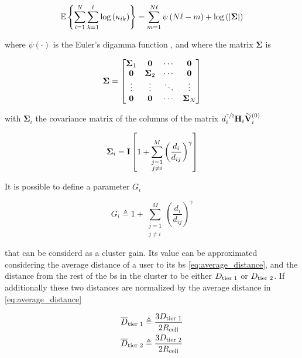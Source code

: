 \begin{equation} \label{eq:sum_log_kappa}
    \mathbb{E}\left\{\sum_{i=1}^{N}\sum_{k=1}^{\ell}\log\left(\kappa_{ik}
    \right)\right\} = \sum_{m = 1}^{N\ell} \psi\left(N\ell - m\right) +
    \log\left(\left|\mathbf{\Sigma}\right|\right)
\end{equation}

\noindent
where $\psi\left(\cdot\right)$ is the Euler's digamma function
\cite{gradshteyn00}, and where the matrix $\mathbf{\Sigma}$ is

\begin{equation} \label{eq:covariance_total}
    \mathbf{\Sigma} = \begin{bmatrix}
        \mathbf{\Sigma}_1 & \mathbf{0} & \cdots & \mathbf{0} \\
        \mathbf{0} & \mathbf{\Sigma}_2 & \cdots & \mathbf{0} \\
        \vdots & \vdots & \ddots & \vdots \\
        \mathbf{0} & \mathbf{0} & \cdots & \mathbf{\Sigma}_N
    \end{bmatrix}
\end{equation}

\noindent
with $\mathbf{\Sigma}_i$ the covariance matrix of the columns of the matrix
$d_{i}^{\sfrac{\gamma}{2}} \mathbf{H}_i \mathbf{\widetilde{V}}_i^{(0)}$

\begin{equation} \label{eq:covariance_not_eye}
    \mathbf{\Sigma}_i = \mathbf{I} \left[1 + \sum\limits_{\substack{j=1\\j\neq i}}^{M}
        \left(\frac{d_{i}}{d_{ij}}\right)^{\gamma}
    \right]
\end{equation}

It is possible to define a parameter $G_i$

\begin{equation} \label{eq:cluster_gain}
    G_i \triangleq 1 + \sum\limits_{\substack{j=1\\j\neq i}}^{M} \left(
    \frac{d_{i}}{d_{ij}}\right)^{\gamma}
\end{equation}

\noindent
that can be considerd as a cluster gain. Its value can be approximated
considering the average distance of a user to its \gls{bs} 
\eqref{eq:average_distance}, and the distance from the rest of the \gls{bs} in
the cluster to be either $D_{\text{tier 1}}$ or $D_{\text{tier 2}}$. If additionally these two
distances are normalized by the average distance in \eqref{eq:average_distance}

\begin{equation} \label{eq:normalized_distances}
\begin{aligned}
    \overline{D}_{\text{tier 1}} &\triangleq \frac{3D_{\text{tier 1}}}{2R_{\text{cell}}} \\
    \overline{D}_{\text{tier 2}} &\triangleq \frac{3D_{\text{tier 2}}}{2R_{\text{cell}}}
\end{aligned}
\end{equation}

